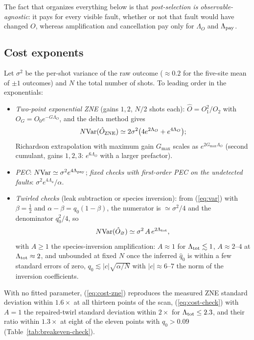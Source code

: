 \documentclass[11pt,a4paper]{article}
\theoremstyle{remark}
\newcommand{\Var}{\mathrm{Var}}
\begin{document}
The fact that organizes everything below is that \emph{post-selection is observable-agnostic}: it pays for every visible fault, whether or not that fault would have changed $O$, whereas amplification and cancellation pay only for $\Lambda_O$ and $\Lambda_{\rm pay}$.

\subsection{Cost exponents}

Let $\sigma^2$ be the per-shot variance of the raw outcome ($\approx0.2$ for the five-site mean of $\pm1$ outcomes) and $N$ the total number of shots. To leading order in the exponentials:
\begin{itemize}
\item \emph{Two-point exponential ZNE} (gains $1,2$, $N/2$ shots each): $\hat O=O_1^2/O_2$ with $O_G=O_0e^{-G\Lambda_O}$, and the delta method gives
\begin{equation}
N\Var(\hat O_{\rm ZNE})\simeq2\sigma^2\bigl(4e^{2\Lambda_O}+e^{4\Lambda_O}\bigr);
\label{eq:cost-zne}
\end{equation}
Richardson extrapolation with maximum gain $G_{\max}$ scales as $e^{2G_{\max}\Lambda_O}$ (second cumulant, gains $1,2,3$: $e^{6\Lambda_O}$ with a larger prefactor).
\item \emph{PEC}: $N\Var\simeq\sigma^2e^{4\Lambda_{\rm pay}}$; \emph{fixed checks with first-order PEC on the undetected faults}: $\sigma^2e^{4\Lambda_u}/\alpha$.
\item \emph{Twirled checks} (leak subtraction or species inversion): from (\ref{eq:var}) with $\beta=\tfrac12$ and $\alpha-\beta=q_0(1-\beta)$, the numerator is $\simeq\sigma^2/4$ and the denominator $q_0^2/4$, so
\begin{equation}
N\Var(\hat O_\varnothing)\simeq\sigma^2\,A\,e^{2\Lambda_{\rm tot}},
\label{eq:cost-check}
\end{equation}
with $A\ge1$ the species-inversion amplification: $A\approx1$ for $\Lambda_{\rm tot}\lesssim1$, $A\approx2$--$4$ at $\Lambda_{\rm tot}\approx2$, and unbounded at fixed $N$ once the inferred $\hat q_0$ is within a few standard errors of zero, $q_0\lesssim|c|\sqrt{\alpha/N}$ with $|c|\approx6$--$7$ the norm of the inversion coefficients.
\end{itemize}
With no fitted parameter, (\ref{eq:cost-zne}) reproduces the measured ZNE standard deviation within $1.6\times$ at all thirteen points of the scan, (\ref{eq:cost-check}) with $A=1$ the repaired-twirl standard deviation within $2\times$ for $\Lambda_{\rm tot}\le2.3$, and their ratio within $1.3\times$ at eight of the eleven points with $q_0>0.09$ (Table~\ref{tab:breakeven-check}).
\end{document}
